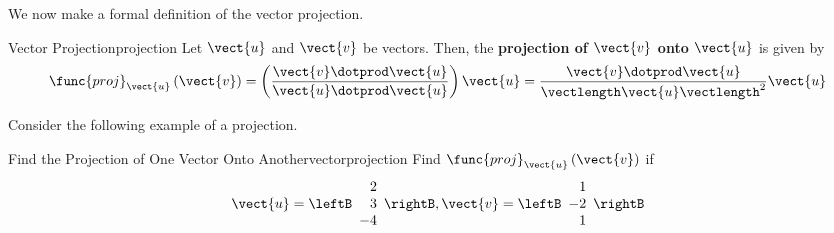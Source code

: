 We now make a formal definition of the vector projection.

\begin{definition}{Vector Projection}{projection}
Let $\vect{u}$ and $\vect{v}$ be vectors. Then, the \textbf{projection of $\vect{v}$ onto
$\vect{u}$} is given by 
\begin{equation*}
\func{proj}_{\vect{u}}\left( \vect{v}\right) =\left( \vspace{0.05in}
\frac{\vect{v}\dotprod \vect{u}}{\vect{u}\dotprod \vect{u}}\right) \vect{u}
=
\frac{\vect{v}\dotprod \vect{u}}{\vectlength \vect{u}\vectlength ^{2}}\vect{u}
\end{equation*}
\end{definition}

Consider the following example of a projection.

\begin{example}{Find the Projection of One Vector Onto Another}{vectorprojection}
Find 
$\func{proj}_{\vect{u}}\left( \vect{v}\right) $ if 
\begin{equation*}
\vect{u}=
\leftB
\begin{array}{r}
2 \\
3 \\
-4
\end{array}
\rightB,
\vect{v}=
\leftB
\begin{array}{r}
1 \\
-2 \\
1
\end{array}
\rightB
\end{equation*}
\end{example}

